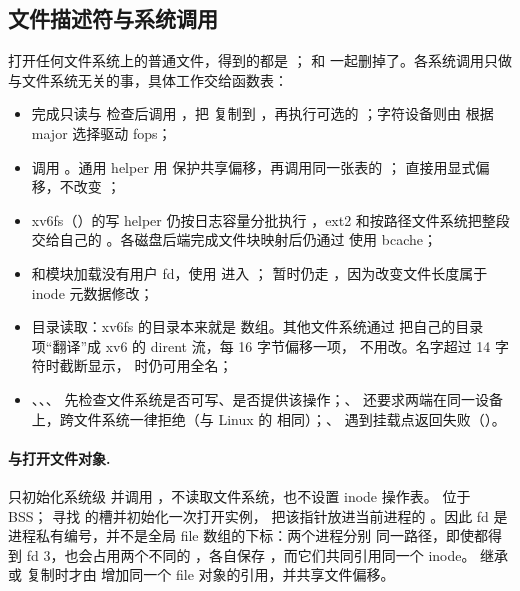 \subsection{文件描述符与系统调用}

打开任何文件系统上的普通文件，得到的都是 ； 和  一起删掉了。各系统调用只做与文件系统无关的事，具体工作交给函数表：

\begin{itemize}
  \item {} 完成只读与  检查后调用 ，把  复制到 ，再执行可选的 ；字符设备则由  根据 major 选择驱动 fops；
  \item {} 调用 。通用 helper 用  保护共享偏移，再调用同一张表的 ； 直接用显式偏移，不改变 ；
  \item xv6fs（）的写 helper 仍按日志容量分批执行 ，ext2 和按路径文件系统把整段交给自己的 。各磁盘后端完成文件块映射后仍通过  使用 bcache；
  \item {} 和模块加载没有用户 fd，使用  进入 ； 暂时仍走 ，因为改变文件长度属于 inode 元数据修改；
  \item 目录读取：xv6fs 的目录本来就是  数组。其他文件系统通过  把自己的目录项“翻译”成 xv6 的 dirent 流，每 16 字节偏移一项， 不用改。名字超过 14 字符时截断显示， 时仍可用全名；
  \item {}、、、 先检查文件系统是否可写、是否提供该操作；、 还要求两端在同一设备上，跨文件系统一律拒绝（与 Linux 的  相同）；、 遇到挂载点返回失败（）。
\end{itemize}

\paragraph{ 与打开文件对象.}
 只初始化系统级  并调用 ，不读取文件系统，也不设置 inode 操作表。 位于 BSS； 寻找  的槽并初始化一次打开实例， 把该指针放进当前进程的 。因此 fd 是进程私有编号，并不是全局 file 数组的下标：两个进程分别  同一路径，即使都得到 fd 3，也会占用两个不同的 ，各自保存 ，而它们共同引用同一个 inode。 继承或  复制时才由  增加同一个 file 对象的引用，并共享文件偏移。

